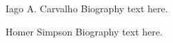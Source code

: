 \documentclass[journal]{IEEEtran}
\begin{document}
\begin{IEEEbiography}{Iago A. Carvalho}
Biography text here.
\end{IEEEbiography}

\begin{IEEEbiographynophoto}{Homer Simpson}
Biography text here.
\end{IEEEbiographynophoto}







\end{document}
